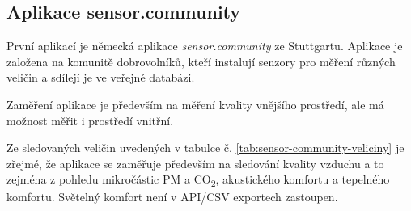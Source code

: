 \FloatBarrier
\subsection{Aplikace sensor.community}

První aplikací je německá aplikace \textit{sensor.community} ze Stuttgartu. Aplikace je založena na komunitě dobrovolníků, kteří instalují senzory pro měření různých veličin a sdílejí je ve veřejné databázi. \parencite{SensorCommunityBuildYour}

Zaměření aplikace je především na měření kvality vnějšího prostředí, ale má možnost měřit i prostředí vnitřní.

Ze sledovaných veličin uvedených v tabulce č. \ref{tab:sensor-community-veliciny} je zřejmé, že aplikace se zaměřuje především na sledování kvality vzduchu a to zejména z pohledu mikročástic PM a CO\textsubscript{2}, akustického komfortu a tepelného komfortu. Světelný komfort není v API/CSV exportech zastoupen.

